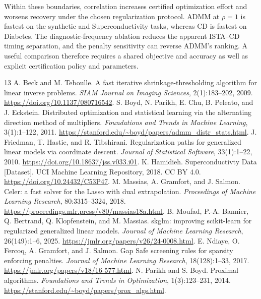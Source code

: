 \documentclass{article}
\begin{document}
Within these boundaries, correlation increases certified optimization effort and worsens recovery under the chosen regularization protocol. ADMM at $\rho=1$ is fastest on the synthetic and Superconductivity tasks, whereas CD is fastest on Diabetes. The diagnostic-frequency ablation reduces the apparent ISTA--CD timing separation, and the penalty sensitivity can reverse ADMM's ranking. A useful comparison therefore requires a shared objective and accuracy as well as explicit certification policy and parameters.

\clearpage
\begin{thebibliography}{13}
 A. Beck and M. Teboulle. A fast iterative shrinkage-thresholding algorithm for linear inverse problems. \emph{SIAM Journal on Imaging Sciences}, 2(1):183--202, 2009. \url{https://doi.org/10.1137/080716542}.
 S. Boyd, N. Parikh, E. Chu, B. Peleato, and J. Eckstein. Distributed optimization and statistical learning via the alternating direction method of multipliers. \emph{Foundations and Trends in Machine Learning}, 3(1):1--122, 2011. \url{https://stanford.edu/~boyd/papers/admm_distr_stats.html}.
 J. Friedman, T. Hastie, and R. Tibshirani. Regularization paths for generalized linear models via coordinate descent. \emph{Journal of Statistical Software}, 33(1):1--22, 2010. \url{https://doi.org/10.18637/jss.v033.i01}.
 K. Hamidieh. Superconductivty Data [Dataset]. UCI Machine Learning Repository, 2018. CC BY 4.0. \url{https://doi.org/10.24432/C53P47}.
 M. Massias, A. Gramfort, and J. Salmon. Celer: a fast solver for the Lasso with dual extrapolation. \emph{Proceedings of Machine Learning Research}, 80:3315--3324, 2018. \url{https://proceedings.mlr.press/v80/massias18a.html}.
 B. Moufad, P.-A. Bannier, Q. Bertrand, Q. Klopfenstein, and M. Massias. skglm: improving scikit-learn for regularized generalized linear models. \emph{Journal of Machine Learning Research}, 26(149):1--6, 2025. \url{https://jmlr.org/papers/v26/24-0008.html}.
 E. Ndiaye, O. Fercoq, A. Gramfort, and J. Salmon. Gap Safe screening rules for sparsity enforcing penalties. \emph{Journal of Machine Learning Research}, 18(128):1--33, 2017. \url{https://jmlr.org/papers/v18/16-577.html}.
 N. Parikh and S. Boyd. Proximal algorithms. \emph{Foundations and Trends in Optimization}, 1(3):123--231, 2014. \url{https://stanford.edu/~boyd/papers/prox_algs.html}.

\end{thebibliography}
\end{document}

